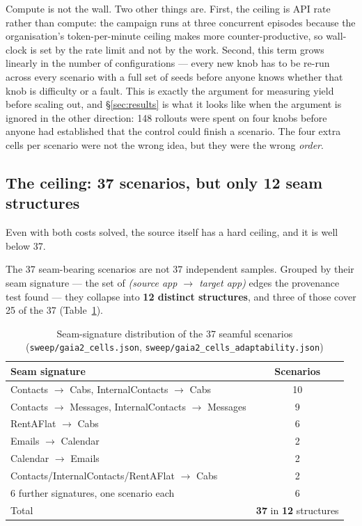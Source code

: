 \documentclass[11pt,a4paper]{article}
\begin{document}
Compute is not the wall. Two other things are. First, the ceiling is API rate rather than compute: the campaign runs at three concurrent episodes because the organisation's token-per-minute ceiling makes more counter-productive, so wall-clock is set by the rate limit and not by the work. Second, this term grows linearly in the number of configurations --- every new knob has to be re-run across every scenario with a full set of seeds before anyone knows whether that knob is difficulty or a fault. This is exactly the argument for measuring yield before scaling out, and \S\ref{sec:results} is what it looks like when the argument is ignored in the other direction: 148 rollouts were spent on four knobs before anyone had established that the control could finish a scenario. The four extra cells per scenario were not the wrong idea, but they were the wrong \emph{order}.

\subsection{The ceiling: 37 scenarios, but only 12 seam structures}
\label{sec:ceiling}

Even with both costs solved, the source itself has a hard ceiling, and it is well below 37.

The 37 seam-bearing scenarios are not 37 independent samples. Grouped by their seam signature --- the set of \emph{(source app $\rightarrow$ target app)} edges the provenance test found --- they collapse into \textbf{12 distinct structures}, and three of those cover 25 of the 37 (Table~\ref{tab:combos}).

\begin{table}[H]
\centering
\small
\caption{Seam-signature distribution of the 37 seamful scenarios (\texttt{sweep/gaia2\_cells.json}, \texttt{sweep/gaia2\_cells\_adaptability.json})}
\label{tab:combos}
\begin{tabularx}{\textwidth}{X c}
\toprule
Seam signature & Scenarios\\
\midrule
Contacts $\rightarrow$ Cabs, InternalContacts $\rightarrow$ Cabs & 10\\
Contacts $\rightarrow$ Messages, InternalContacts $\rightarrow$ Messages & 9\\
RentAFlat $\rightarrow$ Cabs & 6\\
Emails $\rightarrow$ Calendar & 2\\
Calendar $\rightarrow$ Emails & 2\\
Contacts/InternalContacts/RentAFlat $\rightarrow$ Cabs & 2\\
6 further signatures, one scenario each & 6\\
\midrule
Total & \textbf{37} in \textbf{12} structures\\
\bottomrule
\end{tabularx}
\end{table}
\end{document}
